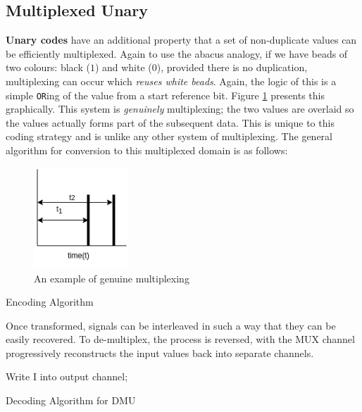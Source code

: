 \documentclass{article}
\begin{document}
\subsection{Multiplexed Unary}

\textbf{Unary codes} have an additional property that a set of non-duplicate values can be efficiently multiplexed. Again to use the abacus analogy, if we have beads of two colours: black ($1$) and white ($0$), provided there is no duplication, multiplexing can occur which \textit{reuses white beads}. Again, the logic of this is a simple \texttt{OR}ing of the value from a start reference bit. Figure \ref{fig:mul1} presents this graphically. This system is \emph{genuinely} multiplexing; the two values are overlaid so the values actually forms part of the subsequent data. This is unique to this coding strategy and is unlike any other system of multiplexing. The general algorithm for conversion to this multiplexed domain is as follows:


\begin{figure}
	\centerline{\includegraphics[width=100pt]{figures/multiplex.png}}
	\caption{An example of genuine multiplexing}\label{fig:mul1}
\end{figure}

\begin{algorithm}
	\SetAlgoLined %
	\caption{Encoding Algorithm}
\end{algorithm}

Once transformed, signals can be interleaved in such a way that they can be easily recovered. To de-multiplex, the process is reversed, with the MUX channel progressively reconstructs the input values back into separate channels.

\begin{algorithm}
	\SetAlgoLined %
	 {
		 {
				Write I into output channel;
			}
	}
	\caption{Decoding Algorithm for DMU}
\end{algorithm}
\end{document}
